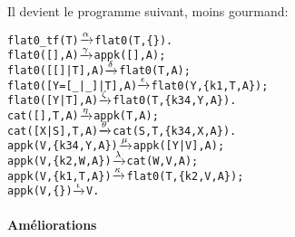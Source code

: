 Il devient le programme suivant, moins gourmand:
\begin{alltt}
flat0\_tf(T)          \(\smashedrightarrow{\alpha}\) flat0(T,\{\}).
flat0(         [],A) \(\smashedrightarrow{\gamma}\) appk([],A);
flat0(     [[]|T],A) \(\smashedrightarrow{\delta}\) flat0(T,A);
flat0([Y=[\_|\_]|T],A) \(\smashedrightarrow{\epsilon}\) flat0(Y,\{k1,T,A\});
flat0(      [Y|T],A) \(\smashedrightarrow{\zeta}\) flat0(T,\{k34,Y,A\}).
cat(   [],T,A)       \(\smashedrightarrow{\eta}\) appk(T,A);
cat([X|S],T,A)       \(\smashedrightarrow{\theta}\) cat(S,T,\{k34,X,A\}).
appk(V,\{k34,Y,A\})    \(\smashedrightarrow{\mu}\) appk([Y|V],A);
appk(V, \{k2,W,A\})    \(\smashedrightarrow{\lambda}\) cat(W,V,A);
appk(V, \{k1,T,A\})    \(\smashedrightarrow{\kappa}\) flat0(T,\{k2,V,A\});
appk(V,       \{\})    \(\smashedrightarrow{\iota}\) V.
\end{alltt}

\paragraph{Améliorations}
\label{par:fib_ameliorations}


